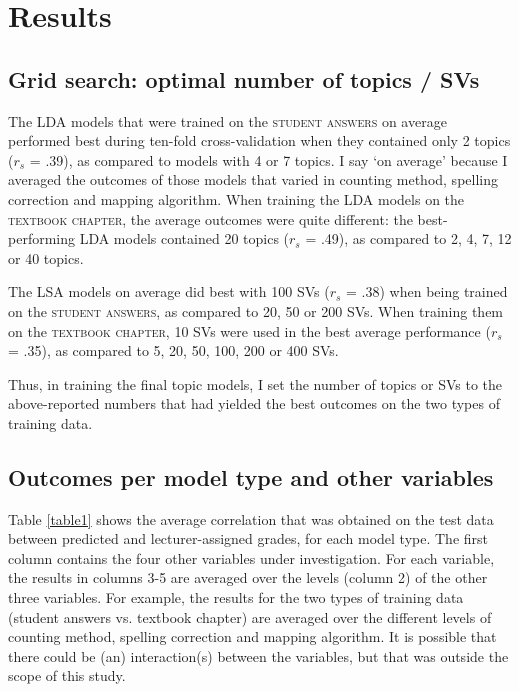 \documentclass[a4paper,10pt,twoside]{article}
\begin{document}
\section{Results}

\subsection{Grid search: optimal number of topics / SVs}
The LDA models that were trained on the \textsc{student answers} on average performed best during ten-fold cross-validation when they contained only 2 topics ($\textit{r}_s$ = .39), as compared to models with 4 or 7 topics. I say `on average' because I averaged the outcomes of those models that varied in counting method, spelling correction and mapping algorithm. When training the LDA models on the \textsc{textbook chapter}, the average outcomes were quite different: the best-performing LDA models contained 20 topics ($\textit{r}_s$ = .49), as compared to 2, 4, 7, 12 or 40 topics.

The LSA models on average did best with 100 SVs ($\textit{r}_s$ = .38) when being trained on the \textsc{student answers}, as compared to 20, 50 or 200 SVs. When training them on the \textsc{textbook chapter}, 10 SVs were used in the best average performance ($\textit{r}_s$ = .35), as compared to 5, 20, 50, 100, 200 or 400 SVs.

Thus, in training the final topic models, I set the number of topics or SVs to the above-reported numbers that had yielded the best outcomes on the two types of training data.

\subsection{Outcomes per model type and other variables}
\label{sec:averageoutcomes}
Table \ref{table1} shows the average correlation that was obtained on the test data between predicted and lecturer-assigned grades, for each model type. The first column contains the four other variables under investigation. For each variable, the results in columns 3-5 are averaged over the levels (column 2) of the other three variables. For example, the results for the two types of training data (student answers vs. textbook chapter) are averaged over the different levels of counting method, spelling correction and mapping algorithm. It is possible that there could be (an) interaction(s) between the variables, but that was outside the scope of this study.
\end{document}
